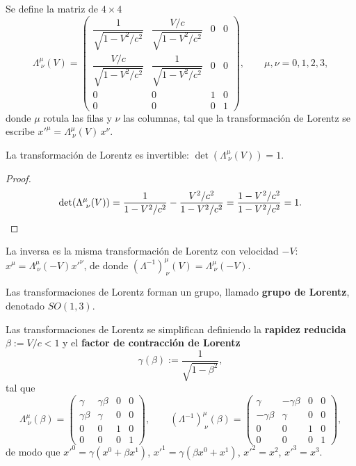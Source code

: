 \begin{definicion}
Se define la matriz de $4\times4$
\[
\Lambda^\mu_{\ \nu}(V) = \begin{pmatrix}
\dfrac{1}{\sqrt{1-V^2/c^2}} & \dfrac{V/c}{\sqrt{1-V^2/c^2}} & 0 & 0 \\[8pt]
\dfrac{V/c}{\sqrt{1-V^2/c^2}} & \dfrac{1}{\sqrt{1-V^2/c^2}} & 0 & 0 \\[8pt]
0 & 0 & 1 & 0 \\ 0 & 0 & 0 & 1
\end{pmatrix}, \qquad \mu,\nu=0,1,2,3,
\]
donde $\mu$ rotula las filas y $\nu$ las columnas, tal que la
transformación de Lorentz se escribe $x'^\mu = \Lambda^\mu_{\ \nu}(V)\,
x^\nu$.
\end{definicion}

\begin{proposicionc}
La transformación de Lorentz es invertible: $\det(\Lambda^\mu_{\
\nu}(V)) = 1$.
\end{proposicionc}

\begin{proof}
\[
\det(\Lambda^\mu_{\ \nu}(V)) = \frac{1}{1-V^2/c^2} - \frac{V^2/c^2}
{1-V^2/c^2} = \frac{1-V^2/c^2}{1-V^2/c^2} = 1 . \qedhere
\]
\end{proof}

La inversa es la misma transformación de Lorentz con velocidad $-V$:
$x^\mu = \Lambda^\mu_{\ \nu}(-V)x'^\nu$, de donde
$(\Lambda^{-1})^\mu_{\ \nu}(V) = \Lambda^\mu_{\ \nu}(-V)$.

\begin{proposicionc}
Las transformaciones de Lorentz forman un grupo, llamado \textbf{grupo
de Lorentz}, denotado $SO(1,3)$.
\end{proposicionc}

Las transformaciones de Lorentz se simplifican definiendo la
\textbf{rapidez reducida} $\beta:=V/c<1$ y el \textbf{factor de
contracción de Lorentz}
\[
\gamma(\beta) := \frac{1}{\sqrt{1-\beta^2}},
\]
tal que
\[
\Lambda^\mu_{\ \nu}(\beta) = \begin{pmatrix} \gamma & \gamma\beta & 0 &
0 \\ \gamma\beta & \gamma & 0 & 0 \\ 0&0&1&0 \\ 0&0&0&1 \end{pmatrix},
\qquad (\Lambda^{-1})^\mu_{\ \nu}(\beta) = \begin{pmatrix} \gamma &
-\gamma\beta & 0 & 0 \\ -\gamma\beta & \gamma & 0 & 0 \\ 0&0&1&0 \\
0&0&0&1 \end{pmatrix},
\]
de modo que $x'^0=\gamma(x^0+\beta x^1)$, $x'^1=\gamma(\beta x^0+x^1)$,
$x'^2=x^2$, $x'^3=x^3$.

